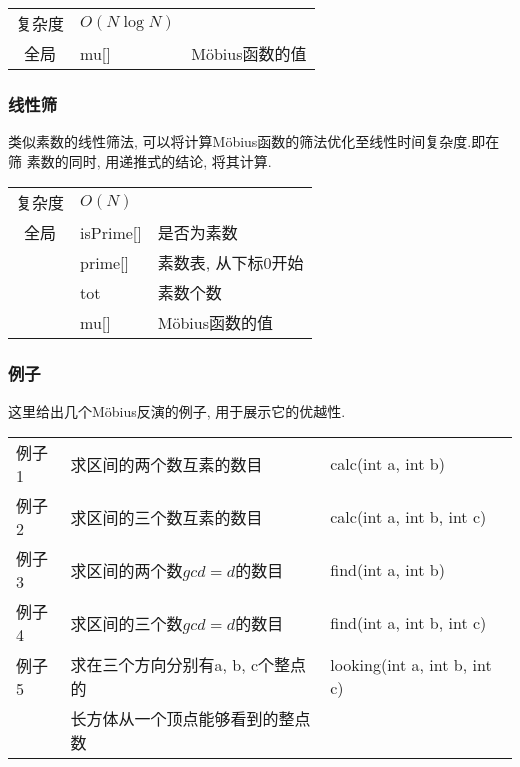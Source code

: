 \begin{longtable}{|c|l|l|}
复杂度 & $O(N\log N)$ &  \\
全局 & mu[] & M\"{o}bius函数的值 \\ 
\end{longtable}



        \subsubsection{线性筛}\small
类似素数的线性筛法, 可以将计算M\"{o}bius函数的筛法优化至线性时间复杂度.即在筛
素数的同时, 用递推式的结论, 将其计算.

\begin{longtable}{|c|l|l|}
复杂度 & $O(N)$ &  \\
全局 & isPrime[] & 是否为素数 \\
 & prime[] & 素数表, 从下标0开始 \\
 & tot & 素数个数 \\
 & mu[] & M\"{o}bius函数的值 \\ 
\end{longtable}



        \subsubsection{例子}\small
这里给出几个M\"{o}bius反演的例子, 用于展示它的优越性.
\begin{longtable}{|l|l|l|}
例子1 & 求区间的两个数互素的数目 & calc(int a, int b) \\
例子2 & 求区间的三个数互素的数目 & calc(int a, int b, int c) \\
例子3 & 求区间的两个数$gcd = d$的数目 & find(int a, int b) \\
例子4 & 求区间的三个数$gcd = d$的数目 & find(int a, int b, int c) \\
例子5 & 求在三个方向分别有a, b, c个整点的 & looking(int a, int b, int c) \\
      & 长方体从一个顶点能够看到的整点数 &  \\
\end{longtable}




